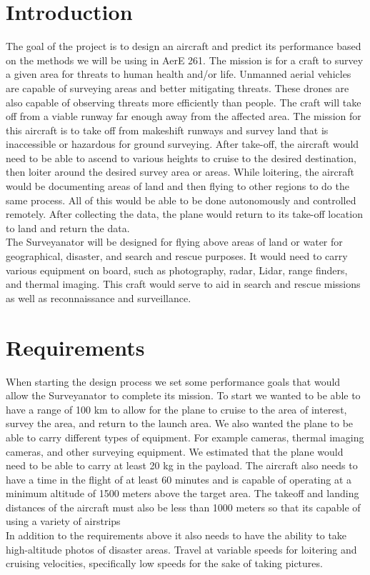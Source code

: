\documentclass[12pt,A4paper]{article}
\begin{document}
	\section{Introduction}
	\hspace{.15 in} The goal of the project is to design an aircraft and predict its performance based on the methods we will be using in AerE 261. The mission is for a craft to survey a given area for threats to human health and/or life. Unmanned aerial vehicles are capable of surveying areas and better mitigating threats. These drones are also capable of observing threats more efficiently than people. The craft will take off from a viable runway far enough away from the affected area. The mission for this aircraft is to take off from makeshift runways and survey land that is inaccessible or hazardous for ground surveying. After take-off, the aircraft would need to be able to ascend to various heights to cruise to the desired destination, then loiter around the desired survey area or areas. While loitering, the aircraft would be documenting areas of land and then flying to other regions to do the same process. All of this would be able to be done autonomously and controlled remotely. After collecting the data, the plane would return to its take-off location to land and return the data. \\
	\indent The Surveyanator will be designed for flying above areas of land or water for geographical, disaster, and search and rescue purposes. It would need to carry various equipment on board, such as photography, radar, Lidar, range finders, and thermal imaging. This craft would serve to aid in search and rescue missions as well as reconnaissance and surveillance.
	

	\clearpage
	\section{Requirements}
	\hspace{.15 in} When starting the design process we set some performance goals that would allow the Surveyanator to complete its mission. To start we wanted to be able to have a range of 100 km to allow for the plane to cruise to the area of interest, survey the area, and return to the launch area. We also wanted the plane to be able to carry different types of equipment. For example cameras, thermal imaging cameras, and other surveying equipment. We estimated that the plane would need to be able to carry at least 20 kg in the payload. The aircraft also needs to have a time in the flight of at least 60 minutes and is capable of operating at a minimum altitude of 1500 meters above the target area. The takeoff and landing distances of the aircraft must also be less than 1000 meters so that its capable of using a variety of airstrips \\
	\indent In addition to the requirements above it also needs to have the ability to take high-altitude photos of disaster areas. Travel at variable speeds for loitering and cruising velocities, specifically low speeds for the sake of taking pictures. 
	
\end{document}
